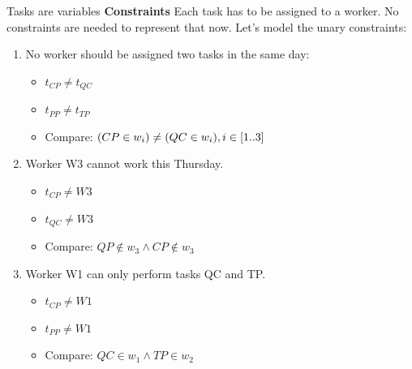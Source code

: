 \documentclass{cons-beamer}
\begin{document}
{  \begin{frame}{Tasks are variables}
    \textbf{Constraints} Each task has to be assigned to a worker.
    No constraints are needed to represent that now.
    Let's model the unary constraints:
    \vfill

    \begin{enumerate}
      \item No worker should be assigned two tasks in the same day:
        \begin{itemize}
          \item $t_{CP} \neq t_{QC}$
          \item $t_{PP} \neq t_{TP}$
          \item Compare: $(CP \in w_i) \neq (QC \in w_i), i \in [1..3]$
        \end{itemize}
        \vfill

      \item Worker W3 cannot work this Thursday.
        \begin{itemize}
          \item $t_{CP} \neq W3$
          \item $t_{QC} \neq W3$
          \item Compare: $QP \not \in w_3 \land  CP \not \in w_3$
        \end{itemize}
        \vfill

      \item Worker W1 can only perform tasks QC and TP.
        \begin{itemize}
          \item $t_{CP} \neq W1$
          \item $t_{PP} \neq W1$
          \item Compare: $QC \in w_1 \land TP \in w_2$
        \end{itemize}
    \end{enumerate}
  \end{frame}

}

\newcommand{\nStudents}{\mathtt{nStudents}}
\newcommand{\nChairs}{\mathtt{nChairs}}
\newcommand{\nTables}{\mathtt{nTables}}
\newcommand{\tables}{\mathtt{tables}}
\newcommand{\students}{\mathtt{students}}
\newcommand{\chairs}{\mathtt{chairs}}
\end{document}
